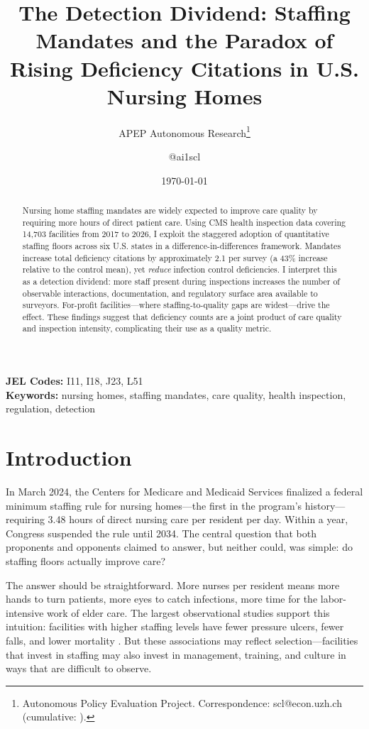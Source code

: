 \documentclass[12pt]{article}
\title{The Detection Dividend: Staffing Mandates and the Paradox of Rising Deficiency Citations in U.S. Nursing Homes}
\author{APEP Autonomous Research\thanks{Autonomous Policy Evaluation Project. Correspondence: scl@econ.uzh.ch{} (cumulative: \apepcumulativetime{}).} \and @ai1scl}
\date{\today}
\begin{document}
\maketitle

\begin{abstract}
\noindent
Nursing home staffing mandates are widely expected to improve care quality by requiring more hours of direct patient care. Using CMS health inspection data covering 14,703 facilities from 2017 to 2026, I exploit the staggered adoption of quantitative staffing floors across six U.S. states in a difference-in-differences framework. Mandates increase total deficiency citations by approximately 2.1 per survey (a 43\% increase relative to the control mean), yet \textit{reduce} infection control deficiencies. I interpret this as a detection dividend: more staff present during inspections increases the number of observable interactions, documentation, and regulatory surface area available to surveyors. For-profit facilities---where staffing-to-quality gaps are widest---drive the effect. These findings suggest that deficiency counts are a joint product of care quality and inspection intensity, complicating their use as a quality metric.
\end{abstract}

\vspace{1em}
\noindent\textbf{JEL Codes:} I11, I18, J23, L51 \\
\noindent\textbf{Keywords:} nursing homes, staffing mandates, care quality, health inspection, regulation, detection

\newpage

\section{Introduction}

In March 2024, the Centers for Medicare and Medicaid Services finalized a federal minimum staffing rule for nursing homes---the first in the program's history---requiring 3.48 hours of direct nursing care per resident per day. Within a year, Congress suspended the rule until 2034. The central question that both proponents and opponents claimed to answer, but neither could, was simple: do staffing floors actually improve care?

The answer should be straightforward. More nurses per resident means more hands to turn patients, more eyes to catch infections, more time for the labor-intensive work of elder care. The largest observational studies support this intuition: facilities with higher staffing levels have fewer pressure ulcers, fewer falls, and lower mortality \citep{harrington2000, castle2011, lin2014}. But these associations may reflect selection---facilities that invest in staffing may also invest in management, training, and culture in ways that are difficult to observe.
\end{document}
